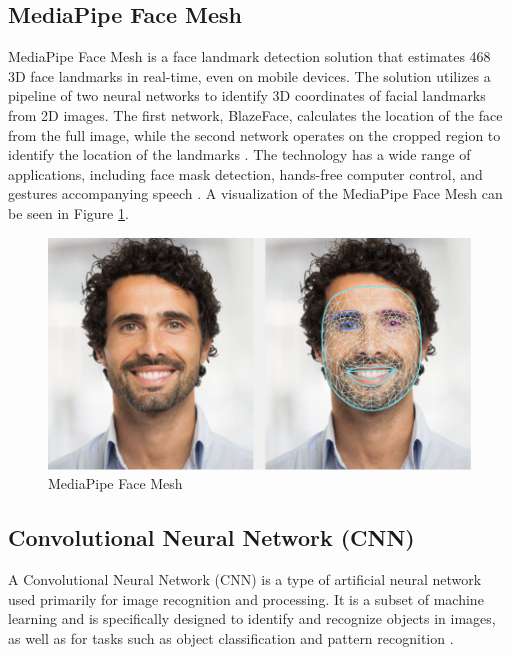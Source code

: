 \subsection{MediaPipe Face Mesh}

MediaPipe Face Mesh is a face landmark detection solution that estimates 468 3D face landmarks in real-time, even on mobile devices. The solution utilizes a pipeline of two neural networks to identify 3D coordinates of facial landmarks from 2D images. The first network, BlazeFace, calculates the location of the face from the full image, while the second network operates on the cropped region to identify the location of the landmarks \cite{mediapipe_2020}. The technology has a wide range of applications, including face mask detection, hands-free computer control, and gestures accompanying speech \cite{thaman_2022}. A visualization of the MediaPipe Face Mesh can be seen in Figure \ref{fig:facemesh}.

\begin{figure} [ht] \centering
    \includegraphics[scale=0.4]{gambar/face_landmark.png}
    \caption{MediaPipe Face Mesh}
    \label{fig:facemesh}
\end{figure}

\subsection{Convolutional Neural Network (CNN)}

A Convolutional Neural Network (CNN) is a type of artificial neural network used primarily for image recognition and processing. It is a subset of machine learning and is specifically designed to identify and recognize objects in images, as well as for tasks such as object classification and pattern recognition \cite{arm_2023}. 


